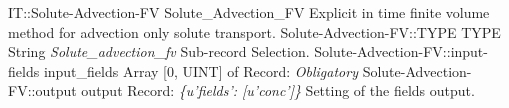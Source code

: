 \begin{RecordType}
	{IT::Solute-Advection-FV}
	{Solute{\_}Advection{\_}FV}
	{} %
	{} %
	{{{Explicit in time finite volume method for advection only solute transport.}}}
		\RecKey
			{Solute-Advection-FV::TYPE}
			{TYPE}
			{{String}}
			{ \it{Solute{\_}advection{\_}fv} }
			{{{Sub-record Selection.}}}
		\RecKey
			{Solute-Advection-FV::input-fields}
			{input{\_}fields}
			{{Array [0, UINT] of }{Record}{: }}
			{ \it{Obligatory} }
			{}
		\RecKey
			{Solute-Advection-FV::output}
			{output}
			{{Record}{: }}
			{ \it{{\{}u'fields': [u'conc']{\}}} }
			{{{Setting of the fields output.}}}
\end{RecordType}
